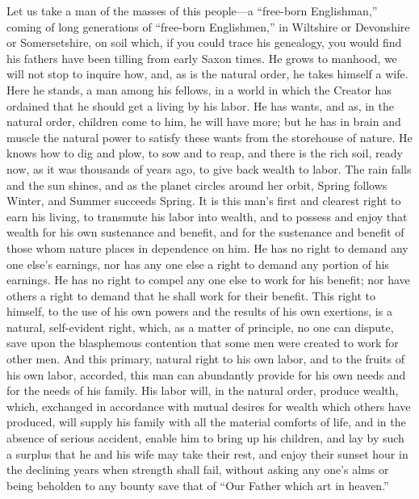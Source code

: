 \documentclass{book}
\begin{document}
Let us take a man of the masses of this people—a “free-born Englishman,” coming of long generations of “free-born Englishmen,” in Wiltshire or Devonshire or Somersetshire, on soil which, if you could trace his genealogy, you would find his fathers have been tilling from early Saxon times. He grows to manhood, we will not stop to inquire how, and, as is the natural order, he takes himself a wife. Here he stands, a man among his fellows, in a world in which the Creator has ordained that he should get a living by his labor. He has wants, and as, in the natural order, children come to him, he will have more; but he has in brain and muscle the natural power to satisfy these wants from the storehouse of nature. He knows how to dig and plow, to sow and to reap, and there is the rich soil, ready now, as it was thousands of years ago, to give back wealth to labor. The rain falls and the sun shines, and as the planet circles around her orbit, Spring follows Winter, and Summer succeeds Spring. It is this man’s first and clearest right to earn his living, to transmute his labor into wealth, and to possess and enjoy that wealth for his own sustenance and benefit, and for the sustenance and benefit of those whom nature places in dependence on him. He has no right to demand any one else’s earnings, nor has any one else a right to demand any portion of his earnings. He has no right to compel any one else to work for his benefit; nor have others a right to demand that he shall work for their benefit. This right to himself, to the use of his own powers and the results of his own exertions, is a natural, self-evident right, which, as a matter of principle, no one can dispute, save upon the blasphemous contention that some men were created to work for other men. And this primary, natural right to his own labor, and to the fruits of his own labor, accorded, this man can abundantly provide for his own needs and for the needs of his family. His labor will, in the natural order, produce wealth, which, exchanged in accordance with mutual desires for wealth which others have produced, will supply his family with all the material comforts of life, and in the absence of serious accident, enable him to bring up his children, and lay by such a surplus that he and his wife may take their rest, and enjoy their sunset hour in the declining years when strength shall fail, without asking any one’s alms or being beholden to any bounty save that of “Our Father which art in heaven.”
\end{document}
